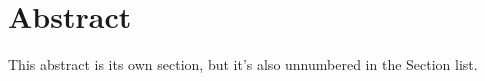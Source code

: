 \section*{Abstract}

This abstract is its own section, but it's also unnumbered in the Section list.
